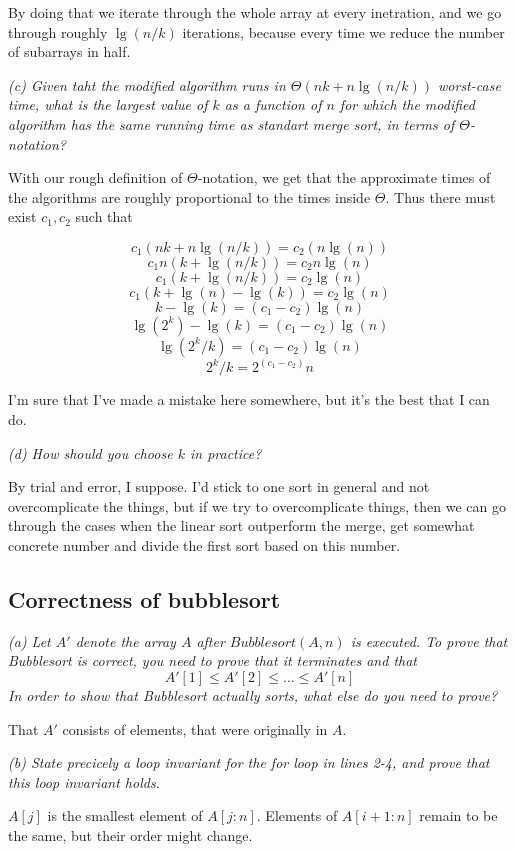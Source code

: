 \documentclass[11pt,oneside,titlepage]{book}
\begin{document}
By doing that we iterate through the whole array at every inetration, and we go through roughly
$\lg(n/k)$ iterations, because every time we reduce the number of subarrays in half.

\textit{(c) Given taht the modified algorithm runs in $\Theta(nk + n\lg(n/k))$ worst-case time,
  what is the largest value of $k$ as a function of $n$ for which the modified algorithm has the
  same running time as standart merge sort, in terms of $\Theta$-notation?}

With our rough definition of $\Theta$-notation, we get that the approximate times of the
algorithms are roughly proportional to the times inside $\Theta$. Thus there must exist
$c_1, c_2$ such that

$$c_1(nk + n\lg(n/k)) = c_2(n \lg(n))$$
$$c_1n(k + \lg(n/k)) = c_2 n\lg(n)$$
$$c_1(k + \lg(n/k)) = c_2\lg(n)$$
$$c_1(k + \lg(n) - \lg(k)) = c_2\lg(n)$$
$$k - \lg(k) = (c_1 - c_2)\lg(n)$$
$$\lg(2^k) - \lg(k) = (c_1 - c_2)\lg(n)$$
$$\lg(2^k/k) = (c_1 - c_2)\lg(n)$$
$$2^k/k = 2^{(c_1 - c_2)}n$$

I'm sure that I've made a mistake here somewhere, but it's the best that I can do.

\textit{(d) How should you choose $k$ in practice? }

By trial and error, I suppose. I'd stick to one sort in general and not overcomplicate the things,
but if we try to overcomplicate things, then we can go through the cases when the linear
sort outperform the merge, get somewhat concrete number and divide the first sort based on this
number.

\subsection{Correctness of bubblesort}

\textit{(a) Let $A'$ denote the array $A$ after $Bubblesort(A, n)$ is executed. To prove that
  Bubblesort is correct, you need to prove that it terminates and that
  $$A'[1] \leq A'[2] \leq ... \leq A'[n]$$
  In order to show that Bubblesort actually sorts, what else do you need to prove? }

That $A'$ consists of elements, that were originally in $A$.

\textit{(b) State precicely a loop invariant for the for loop in lines 2-4, and prove that
  this loop invariant holds.}

$A[j]$ is the smallest element of $A[j:n]$. Elements of $A[i + 1: n]$ remain to be the same,
but their order might change.
\end{document}
